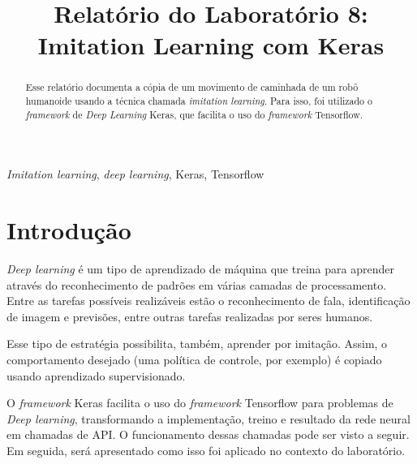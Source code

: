 \documentclass[conference]{IEEEtran}
\begin{document}
\title{Relatório do Laboratório 8: \\ Imitation Learning com Keras\\
}

\author{
}

\maketitle

\begin{abstract}
Esse relatório documenta a cópia de um movimento de caminhada de um robô humanoide usando a técnica chamada \textit{imitation learning}. Para isso, foi utilizado o \textit{framework} de \textit{Deep Learning} Keras, que facilita o uso do \textit{framework} Tensorflow.
\end{abstract}

\begin{IEEEkeywords}
\textit{Imitation learning}, \textit{deep learning}, Keras, Tensorflow
\end{IEEEkeywords}

\section{Introdução}
\textit{Deep learning} é um tipo de aprendizado de máquina que treina para aprender através do reconhecimento de padrões em várias camadas de processamento. Entre as tarefas possíveis realizáveis estão o reconhecimento de fala, identificação de imagem e previsões, entre outras tarefas realizadas por seres humanos. 

Esse tipo de estratégia possibilita, também, aprender por imitação. Assim, o comportamento desejado (uma política de controle, por exemplo) é copiado usando aprendizado supervisionado.

O \textit{framework} Keras facilita o uso do \textit{framework} Tensorflow para problemas de \textit{Deep learning}, transformando a implementação, treino e resultado da rede neural em chamadas de API. O funcionamento dessas chamadas pode ser visto a seguir. Em seguida, será apresentado como isso foi aplicado no contexto do laboratório.
\end{document}
